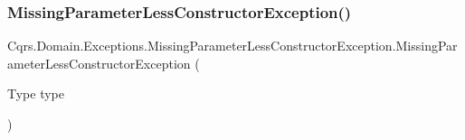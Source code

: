 \subsubsection{\texorpdfstring{Missing\+Parameter\+Less\+Constructor\+Exception()}{MissingParameterLessConstructorException()}}
{\footnotesize\ttfamily Cqrs.\+Domain.\+Exceptions.\+Missing\+Parameter\+Less\+Constructor\+Exception.\+Missing\+Parameter\+Less\+Constructor\+Exception (\begin{DoxyParamCaption}\item[{Type}]{type }\end{DoxyParamCaption})}

